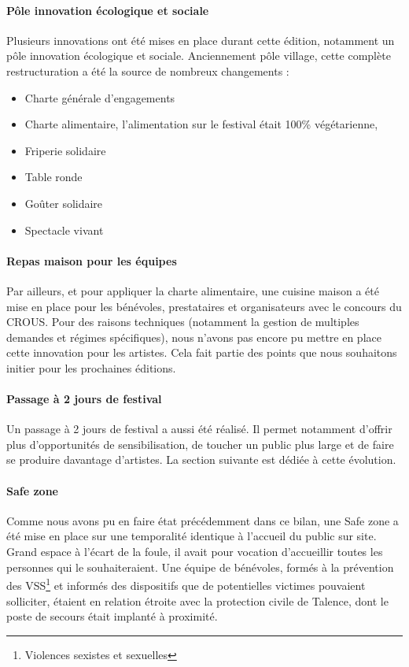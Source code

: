 \documentclass[12pt,a4paper]{report}
\begin{document}
\paragraph{Pôle innovation écologique et sociale}
Plusieurs innovations ont été mises en place  durant cette édition, notamment un pôle innovation écologique et sociale. Anciennement pôle village, cette complète restructuration a été la source de nombreux changements : 
\begin{itemize}
\item Charte générale d’engagements
\item Charte alimentaire, l'alimentation sur le festival était 100\% végétarienne,
\item Friperie solidaire
\item Table ronde
\item Goûter solidaire
\item Spectacle vivant
\end{itemize}

\paragraph{Repas maison pour les équipes}
Par ailleurs, et pour appliquer la charte alimentaire, une cuisine maison a été mise en place pour les bénévoles, prestataires et organisateurs avec le concours du CROUS. Pour des raisons techniques (notamment la gestion de multiples demandes et régimes spécifiques), nous n'avons pas encore pu mettre en place cette innovation pour les artistes. Cela fait partie des points que nous souhaitons initier pour les prochaines éditions.

\paragraph{Passage à 2 jours de festival}
Un passage à 2 jours de festival a aussi été réalisé. Il permet notamment d'offrir plus d'opportunités de sensibilisation, de toucher un public plus large et de faire se produire davantage d'artistes. La section suivante est dédiée à cette évolution.

\paragraph{Safe zone}
Comme nous avons pu en faire état précédemment dans ce bilan, une \og Safe zone \fg{}  a été mise en place sur une temporalité identique à l'accueil du public sur site. Grand espace à l'écart de la foule, il avait pour vocation d'accueillir toutes les personnes qui le souhaiteraient. Une équipe de bénévoles, formés à la prévention des VSS\footnote{Violences sexistes et sexuelles} et informés des dispositifs que de potentielles victimes pouvaient solliciter, étaient en relation étroite avec la protection civile de Talence, dont le poste de secours était implanté à proximité. 
\end{document}
